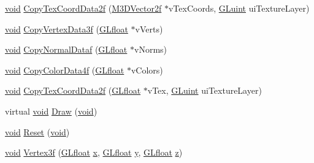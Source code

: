 \begin{DoxyCompactItemize}
\item 
\hyperlink{_s_d_l__opengl_8h_a3db05964a3cc4410f35b7ea2b7eb850d}{void} \hyperlink{class_g_l_batch_aa05a7f3d70a82139e42e185da79a4ec0}{Copy\-Tex\-Coord\-Data2f} (\hyperlink{math3d_8h_a53c353d9bb3250cff53ebefe75cc8013}{M3\-D\-Vector2f} $\ast$v\-Tex\-Coords, \hyperlink{_g_l_e_w_2glew_8h_a68c4714e43d8e827d80759f9cb864f3c}{G\-Luint} ui\-Texture\-Layer)
\item 
\hyperlink{_s_d_l__opengl_8h_a3db05964a3cc4410f35b7ea2b7eb850d}{void} \hyperlink{class_g_l_batch_a9ebfdc74d23cceba6e5778fd359a77e3}{Copy\-Vertex\-Data3f} (\hyperlink{_g_l_e_w_2glew_8h_a4a966015c733cb5fe2733de64a62a3a5}{G\-Lfloat} $\ast$v\-Verts)
\item 
\hyperlink{_s_d_l__opengl_8h_a3db05964a3cc4410f35b7ea2b7eb850d}{void} \hyperlink{class_g_l_batch_ab3f213c2cfd4af3e85911d91aa051ff0}{Copy\-Normal\-Dataf} (\hyperlink{_g_l_e_w_2glew_8h_a4a966015c733cb5fe2733de64a62a3a5}{G\-Lfloat} $\ast$v\-Norms)
\item 
\hyperlink{_s_d_l__opengl_8h_a3db05964a3cc4410f35b7ea2b7eb850d}{void} \hyperlink{class_g_l_batch_a7d3342db45f9fabbd99325a8284c813e}{Copy\-Color\-Data4f} (\hyperlink{_g_l_e_w_2glew_8h_a4a966015c733cb5fe2733de64a62a3a5}{G\-Lfloat} $\ast$v\-Colors)
\item 
\hyperlink{_s_d_l__opengl_8h_a3db05964a3cc4410f35b7ea2b7eb850d}{void} \hyperlink{class_g_l_batch_a130e67e911aebf11b3e4631c782b9ca5}{Copy\-Tex\-Coord\-Data2f} (\hyperlink{_g_l_e_w_2glew_8h_a4a966015c733cb5fe2733de64a62a3a5}{G\-Lfloat} $\ast$v\-Tex, \hyperlink{_g_l_e_w_2glew_8h_a68c4714e43d8e827d80759f9cb864f3c}{G\-Luint} ui\-Texture\-Layer)
\item 
virtual \hyperlink{_s_d_l__opengl_8h_a3db05964a3cc4410f35b7ea2b7eb850d}{void} \hyperlink{class_g_l_batch_a7e74bd85442ff8b58dd690e3bb6bcd6d}{Draw} (\hyperlink{_s_d_l__opengl_8h_a3db05964a3cc4410f35b7ea2b7eb850d}{void})
\item 
\hyperlink{_s_d_l__opengl_8h_a3db05964a3cc4410f35b7ea2b7eb850d}{void} \hyperlink{class_g_l_batch_a1a4a8830dc41e2a3d8c889de5581af16}{Reset} (\hyperlink{_s_d_l__opengl_8h_a3db05964a3cc4410f35b7ea2b7eb850d}{void})
\item 
\hyperlink{_s_d_l__opengl_8h_a3db05964a3cc4410f35b7ea2b7eb850d}{void} \hyperlink{class_g_l_batch_ac89e06f188cf78867d7b8539dda52a94}{Vertex3f} (\hyperlink{_g_l_e_w_2glew_8h_a4a966015c733cb5fe2733de64a62a3a5}{G\-Lfloat} \hyperlink{_g_l_e_w_2glew_8h_a0cdec8e97a75ee9458b23d152bf962d4}{x}, \hyperlink{_g_l_e_w_2glew_8h_a4a966015c733cb5fe2733de64a62a3a5}{G\-Lfloat} \hyperlink{_g_l_e_w_2glew_8h_a74d80fd479c0f6d0153c709949a089ef}{y}, \hyperlink{_g_l_e_w_2glew_8h_a4a966015c733cb5fe2733de64a62a3a5}{G\-Lfloat} \hyperlink{_g_l_e_w_2glew_8h_aee38b51639b577753f6a92029fb92000}{z})

\end{DoxyCompactItemize}
